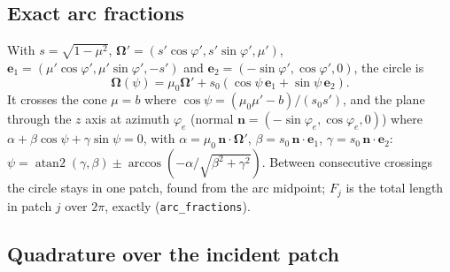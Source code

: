 \documentclass[11pt]{article}
\newcommand{\Om}{\boldsymbol\Omega}
\begin{document}
\subsection{Exact arc fractions}

With $s=\sqrt{1-\mu^2}$, $\Om'=(s'\cos\varphi',s'\sin\varphi',\mu')$,
$\mathbf e_1=(\mu'\cos\varphi',\mu'\sin\varphi',-s')$ and
$\mathbf e_2=(-\sin\varphi',\cos\varphi',0)$, the circle is
\begin{equation}
  \Om(\psi) = \mu_0\Om' + s_0(\cos\psi\,\mathbf e_1 + \sin\psi\,\mathbf e_2).
\end{equation}
It crosses the cone $\mu=b$ where $\cos\psi = (\mu_0\mu'-b)/(s_0s')$, and the plane
through the $z$ axis at azimuth $\varphi_e$ (normal $\mathbf n=(-\sin\varphi_e,
\cos\varphi_e,0)$) where $\alpha+\beta\cos\psi+\gamma\sin\psi=0$, with
$\alpha=\mu_0\,\mathbf n\cdot\Om'$, $\beta=s_0\,\mathbf n\cdot\mathbf e_1$,
$\gamma=s_0\,\mathbf n\cdot\mathbf e_2$: $\psi=\operatorname{atan2}(\gamma,\beta)\pm
\arccos(-\alpha/\sqrt{\beta^2+\gamma^2})$. Between consecutive crossings the circle
stays in one patch, found from the arc midpoint; $F_j$ is the total length in patch
$j$ over $2\pi$, exactly (\texttt{arc\_fractions}).

\subsection{Quadrature over the incident patch}
\end{document}
